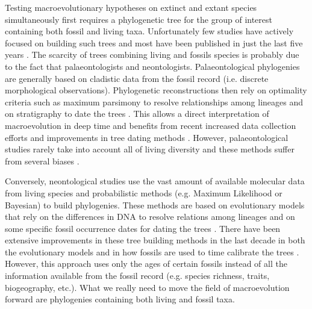 
Testing macroevolutionary hypotheses on extinct and extant species simultaneously first requires a phylogenetic tree for the group of interest containing both fossil and living taxa.
Unfortunately few studies have actively focused on building such trees and most have been published in just the last five years \citep[e.g.][]{ronquista2012,slaterphylogenetic2013,Wood01032013,beckancient2014}.
The scarcity of trees combining living and fossils species is probably due to the fact that palaeontologists and neontologists.
Palaeontological phylogenies are generally based on cladistic data from the fossil record (i.e. discrete morphological observations).
Phylogenetic reconstructions then rely on optimality criteria such as maximum parsimony \citep{Hennig1966,felsenstein2004} to resolve relationships among lineages and on stratigraphy to date the trees \citep{GoloboffTNT}.
This allows a direct interpretation of macroevolution in deep time and benefits from recent increased data collection efforts \citep[e.g. 4541 characters in][introducing the term ``phenomics'']{O'Leary08022013} and improvements in tree dating methods \citep[e.g. the \textit{cal3} method from][]{Bapst2014}.
However, palaeontological studies rarely take into account all of living diversity \citep[e.g. only 38 out of 351 living primates are included with 119 fossils in][]{ni2013oldest} and these methods suffer from several biases \citep[e.g. evolution is not parsimonious;][]{wrightbayesian2014}.

Conversely, neontological studies use the vast amount of available molecular data from living species and probabilistic methods (e.g. Maximum Likelihood or Bayesian) to build phylogenies.
These methods are based on evolutionary models that rely on the differences in DNA to resolve relations among lineages and on some specific fossil occurrence dates for dating the trees \citep[i.e. the molecular clock;][]{zuckerkandl1965}.
There have been extensive improvements in these tree building methods in the last decade in both the evolutionary models \citep[e.g.][]{bapsta2013,stadlerdating2013,heaththe2013} and in how fossils are used to time calibrate the trees \citep{Donoghue2007424,Parham01032012}.
However, this approach uses only the ages of certain fossils instead of all the information available from the fossil record (e.g. species richness, traits, biogeography, etc.).
What we really need to move the field of macroevolution forward are phylogenies containing both living and fossil taxa.


